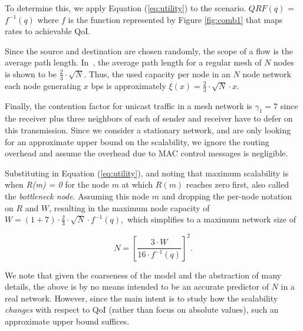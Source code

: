To determine this, we apply Equation (\ref{eq:utility}) to the scenario.
$QRF(q)$ = $f^{-1}(q)$ where $f$ is the function represented by Figure
\ref{fig:comb1} that maps rates to achievable QoI.

Since the source and destination are chosen randomly, the scope of a flow is
the average path length. In~\cite{Silv83}, the average path length for a
regular mesh of $N$ nodes is shown to be
$\frac{2}{3}\cdot \sqrt{N}$. Thus, the used capacity per node
in an $N$ node network each node generating $x$ bps
is approximately $\xi(x) = \frac{2}{3}\cdot \sqrt{N}\cdot
x$.

Finally, the contention factor for unicast traffic in a mesh network
is $\gamma_1 = 7$ since the receiver
plus three neighbors of each of sender and receiver
 have to defer on this transmission. Since we
consider a stationary network, and are only looking for an approximate
upper bound on the scalability, we ignore the routing overhead and
assume the overhead due to MAC control messages is negligible.



Substituting  in Equation (\ref{eq:utility}), and noting that maximum
scalability is when \emph{R(m) = 0} for the node $m$ at which $R(m)$ reaches zero first, also called the \emph{bottleneck node}.  Assuming this node $m$ and dropping the per-node notation on $R$ and $W$, resulting in the maximum node capacity of
$
W = (1+7)\cdot \frac{2}{3}\cdot  \sqrt{N}\cdot  f^{-1}(q),
$
which simplifies to a maximum network size of

\begin{equation}
N = [\frac{3\cdot W}{16\cdot f^{-1}(q)}]^2.
\end{equation}

We note that given the coarseness of the model and the abstraction of many
details, the above is by no means intended to be an accurate predictor of
$N$ in a real network. However, since the main intent is to study how
the scalability {\em changes}
with respect to QoI (rather than focus on absolute values),
such an approximate upper bound suffices.



